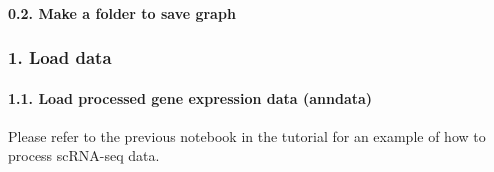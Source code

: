 \documentclass[letterpaper,10pt,english]{sphinxmanual}
\begin{document}
\paragraph{0.2. Make a folder to save graph}
\label{\detokenize{notebooks/04_Network_analysis/Network_analysis_with_with_Paul_etal_2015_data:0.2.-Make-a-folder-to-save-graph}}
{
\begin{sphinxVerbatim}[commandchars=\\\{\}]
\llap{\color{nbsphinxin}[5]:\,\hspace{\fboxrule}\hspace{\fboxsep}}  
 
\end{sphinxVerbatim}
}


\subsubsection{1. Load data}
\label{\detokenize{notebooks/04_Network_analysis/Network_analysis_with_with_Paul_etal_2015_data:1.-Load-data}}

\paragraph{1.1. Load processed gene expression data (anndata)}
\label{\detokenize{notebooks/04_Network_analysis/Network_analysis_with_with_Paul_etal_2015_data:1.1.-Load-processed-gene-expression-data-(anndata)}}
Please refer to the previous notebook in the tutorial for an example of how to process scRNA-seq data.

{
\begin{sphinxVerbatim}[commandchars=\\\{\}]
\llap{\color{nbsphinxin}[6]:\,\hspace{\fboxrule}\hspace{\fboxsep}}
  
\end{sphinxVerbatim}
}
\end{document}

